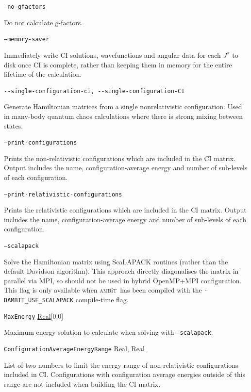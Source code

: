 \documentclass{report}
\newcommand{\ambit}{\textsc{amb}{\footnotesize i}\textsc{t}}
\begin{document}
\texttt{--no-gfactors} 
\begin{adjustwidth}{1cm}{}
Do not calculate g-factors.
\end{adjustwidth}

\texttt{--memory-saver}
\begin{adjustwidth}{1cm}{}
Immediately write CI solutions, wavefunctions and angular data for each $J^{\pi}$ to disk once CI is 
complete, rather than keeping them in memory for the entire lifetime of the calculation. 
\end{adjustwidth}

\texttt{{-}{-}single-configuration-ci, {-}{-}single-configuration-CI}
\begin{adjustwidth}{1cm}{}
Generate Hamiltonian matrices from a single nonrelativistic configuration. Used in many-body quantum
chaos calculations where there is strong mixing between states.
\end{adjustwidth}

\texttt{--print-configurations}
\begin{adjustwidth}{1cm}{}
Prints the non-relativistic configurations which are included in the CI matrix.
Output includes the name, configuration-average energy and number of sub-levels of each configuration.
\end{adjustwidth}

\texttt{--print-relativistic-configurations}
\begin{adjustwidth}{1cm}{}
Prints the relativistic configurations which are included in the CI matrix.
Output includes the name, configuration-average energy and number of sub-levels of each configuration.
\end{adjustwidth}

\texttt{--scalapack}
\begin{adjustwidth}{1cm}{}
Solve the Hamiltonian matrix using ScaLAPACK routines (rather than the default Davidson algorithm). 
This approach directly diagonalises the matrix in parallel via MPI, so should not be used in hybrid
OpenMP+MPI configuration. This flag is only available when \ambit ~has been compiled with the
\texttt{-DAMBIT\_USE\_SCALAPACK} compile-time flag.
\end{adjustwidth}

\texttt{MaxEnergy} \uline{Real}[0.0]
\begin{adjustwidth}{1cm}{}
Maximum energy solution to calculate when solving with \texttt{--scalapack}.
\end{adjustwidth}

\texttt{ConfigurationAverageEnergyRange} \uline{Real, Real}
\begin{adjustwidth}{1cm}{}
List of two numbers to limit the energy range of non-relativistic configurations included in CI.
Configurations with configuration average energies outside of this range are not included when building
the CI matrix.
\end{adjustwidth}
\end{document}
